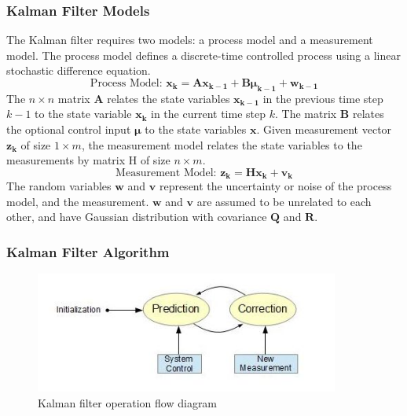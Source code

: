 \subsubsection{Kalman Filter Models}

The Kalman filter requires two models: a process model and a measurement
model. The process model defines a discrete-time controlled process
using a linear stochastic difference equation.
\begin{equation}
\text{Process Model: }
\boldsymbol{x_k} = \boldsymbol{Ax_{k-1}}+
\boldsymbol{B}\boldsymbol{\mu_{k-1}}+\boldsymbol{w_{k-1}}
\end{equation}
\noindent The $n\times n$ matrix $\boldsymbol{A}$ relates the state
variables $\boldsymbol{x_{k-1}}$ in the previous time step $k-1$ to the
state variable $\boldsymbol{x_{k}}$ in the current time step $k$. The
matrix $\boldsymbol{B}$ relates the optional control input $\boldsymbol{\mu}$
to the state variables $\boldsymbol{x}$. Given measurement vector
$\boldsymbol{z_k}$ of size $1 \times m$, the measurement model relates the
state variables to the measurements by matrix H of size $n \times m$.
\begin{equation}
\text{Measurement Model: }\boldsymbol{z_k} = \boldsymbol{Hx_k}+\boldsymbol{v_k}
\end{equation}
The random variables $\boldsymbol{w}$ and $\boldsymbol{v}$ represent the
uncertainty or noise of the process model, and the measurement.
$\boldsymbol{w}$ and $\boldsymbol{v}$ are assumed to be unrelated to each
other, and have Gaussian distribution with covariance $\boldsymbol{Q}$ and $\boldsymbol{R}$.

\subsubsection{Kalman Filter Algorithm}
\begin{figure}[h]
\centering
\includegraphics[width=10cm, keepaspectratio=true]{./Figures/KalmanOperation.jpg}
\caption{Kalman filter operation flow diagram}
\label{figch2:1}
\end{figure}

